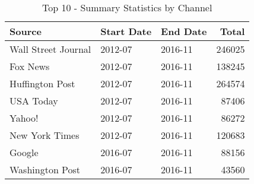 \begin{table}[ht]
\centering
\caption{Top 10 - Summary Statistics by Channel} 
\label{tab:top10_summary_by_channel}
\begin{tabular}{lllr}
  \hline
Source & Start Date & End Date & Total \\ 
  \hline
Wall Street Journal & 2012-07 & 2016-11 & 246025 \\ 
  Fox News & 2012-07 & 2016-11 & 138245 \\ 
  Huffington Post & 2012-07 & 2016-11 & 264574 \\ 
  USA Today & 2012-07 & 2016-11 & 87406 \\ 
  Yahoo! & 2012-07 & 2016-11 & 86272 \\ 
  New York Times & 2012-07 & 2016-11 & 120683 \\ 
  Google & 2016-07 & 2016-11 & 88156 \\ 
  Washington Post & 2016-07 & 2016-11 & 43560 \\ 
   \hline
\end{tabular}
\end{table}
